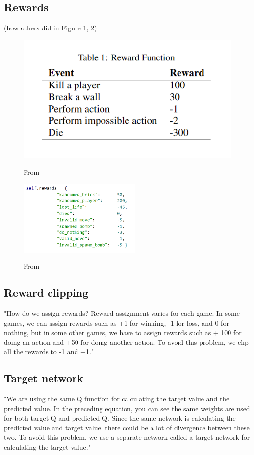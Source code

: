 \documentclass[a4paper ,12pt]{report}
\begin{document}
	\subsection*{Rewards}
	
	(how others did in Figure \ref{fig:rewards}, \ref{fig:rewardsALAN})
	
	\begin{figure}[ht]
		\caption{From \cite{GoulartBomberman}}
		\includegraphics{rewards.png}
		\label{fig:rewards}
	\end{figure}

	\begin{figure}[ht!]
		\caption{From \cite{AlanPresentation}}
		\includegraphics[width=6cm]{rewardsALAN.png}
		\label{fig:rewardsALAN}
	\end{figure}
	
	\subsection*{Reward clipping}
	"How do we assign rewards? Reward assignment varies for each game. In some games, we can assign rewards such as +1 for winning, -1 for loss, and 0 for nothing, but in some other games, we have to assign rewards such as + 100 for doing an action and +50 for doing another action. To avoid this problem, we clip all the rewards to -1 and +1." \cite{UBHD-68505368}
	
	\subsection*{Target network}
	"We are using the same Q function for calculating the target value and the predicted value. In the preceding equation, you can see the same weights  are used for both target Q and predicted Q. Since the same network is calculating the predicted value and target value, there could be a lot of divergence between these two. To avoid this problem, we use a separate network called a target network for calculating the target value." \cite{UBHD-68505368}
	
	
	
\end{document}
